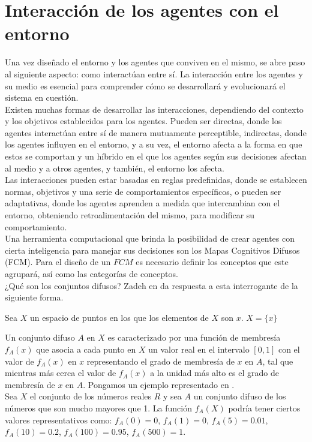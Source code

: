 \section{Interacción de los agentes con el entorno}
Una vez diseñado el entorno y los agentes que conviven en el mismo, se abre paso al siguiente aspecto:
como interactúan entre sí. La interacción entre los agentes y su medio es esencial para comprender 
cómo se desarrollará y evolucionará el sistema en cuestión.\\
Existen muchas formas de desarrollar las interacciones, dependiendo del contexto y los objetivos establecidos
para los agentes. Pueden ser directas, donde los agentes interactúan entre sí de manera mutuamente perceptible,
indirectas, donde los agentes influyen en el entorno, y a su vez, el entorno afecta a la forma en que estos se 
comportan y un híbrido en el que los agentes según sus decisiones afectan al medio y a otros agentes, y también, 
el entorno los afecta.\\
Las interacciones pueden estar basadas en reglas predefinidas, donde se establecen normas, objetivos y una serie
de comportamientos específicos, o pueden ser adaptativas, donde los agentes aprenden a medida que intercambian con
el entorno, obteniendo retroalimentación del mismo, para modificar su comportamiento.\\
Una herramienta computacional que brinda la posibilidad de crear agentes con cierta inteligencia para manejar
sus decisiones son los Mapas Cognitivos Difusos (FCM). Para el diseño de un $FCM$ es necesario definir los 
conceptos que este agrupará, así como las categorías de conceptos.\\
¿Qué son los conjuntos difusos? Zadeh en \autocite{Zadeh1965} da respuesta a esta interrogante de la siguiente forma.
\begin{center}
    Sea $X$ un espacio de puntos en los que los elementos de $X$ son $x$. $X = \lbrace x \rbrace$
\end{center}
Un conjunto difuso $A$ en $X$ es caracterizado por una función de membresía $f_A(x)$ que asocia a cada punto en 
$X$ un valor real en el intervalo $[0, 1]$ con el valor de $f_A(x)$ en $x$ representando el 
grado de membresía de $x$ en $A$, tal que mientras más cerca el valor de $f_A(x)$ a la unidad más alto es 
el grado de membresía de $x$ en $A$. Pongamos un ejemplo representado en \autocite{Zadeh1965}.\\
Sea $X$ el conjunto de los números reales $R$ y sea $A$ un conjunto difuso de los números que son mucho mayores que 1.
La función $f_A(X)$ podría tener ciertos valores representativos como: $f_A(0) = 0$, $f_A(1) = 0$,
$f_A(5) = 0.01$, $f_A(10) = 0.2$, $f_A(100) = 0.95$, $f_A(500) = 1$.\\

